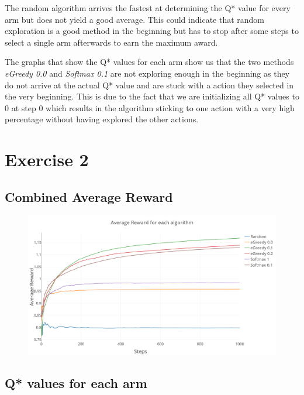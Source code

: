 \documentclass[a4paper, 11pt]{article}
\begin{document}
The random algorithm arrives the fastest at determining the Q* value for every arm but does not yield a good  average. This could indicate that random exploration is a good method in the beginning but has to stop after some steps to select a single arm afterwards to earn the maximum award.

The graphs that show the Q* values for each arm show us that the two methods \textit{eGreedy 0.0} and \textit{Softmax 0.1} are not exploring enough in the beginning as they do not arrive at the actual Q* value and are stuck with a action they selected in the very beginning. This is due to the fact that we are initializing all Q* values to 0 at step 0 which results in the algorithm sticking to one action with a very high percentage without having explored the other actions.

\section{Exercise 2}

\subsection{Combined Average Reward}

\begin{figure}[H]
	\centering
    \includegraphics[width=1\linewidth]{ex1_2_average_rewards}
\end{figure}

\subsection{Q* values for each arm}
\end{document}
